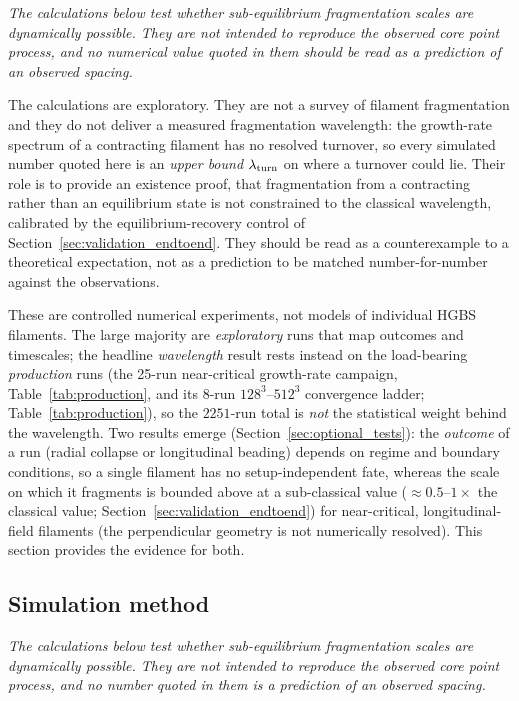 \documentclass[usenatbib,twoside,twocolumn]{mnras}
\begin{document}
\smallskip\noindent\emph{The calculations below test whether sub-equilibrium fragmentation scales are dynamically possible. They are not intended to reproduce the observed core point process, and no numerical value quoted in them should be read as a prediction of an observed spacing.}

\noindent The calculations are exploratory. They are not a survey of filament fragmentation and they do not deliver a measured fragmentation wavelength: the growth-rate spectrum of a contracting filament has no resolved turnover, so every simulated number quoted here is an \emph{upper bound} $\lambda_{\rm turn}$ on where a turnover could lie. Their role is to provide an existence proof, that fragmentation from a contracting rather than an equilibrium state is not constrained to the classical wavelength, calibrated by the equilibrium-recovery control of Section~\ref{sec:validation_endtoend}. They should be read as a counterexample to a theoretical expectation, not as a prediction to be matched number-for-number against the observations.

These are controlled numerical experiments, not models of individual HGBS filaments. The large majority are \emph{exploratory} runs that map outcomes and timescales; the headline \emph{wavelength} result rests instead on the load-bearing \emph{production} runs (the 25-run near-critical growth-rate campaign, Table~\ref{tab:production}, and its 8-run $128^3$--$512^3$ convergence ladder; Table~\ref{tab:production}), so the $2251$-run total is \emph{not} the statistical weight behind the wavelength. Two results emerge (Section~\ref{sec:optional_tests}): the \emph{outcome} of a run (radial collapse or longitudinal beading) depends on regime and boundary conditions, so a single filament has no setup-independent fate, whereas the scale on which it fragments is bounded above at a sub-classical value ($\approx0.5$--$1\times$ the classical value; Section~\ref{sec:validation_endtoend}) for near-critical, longitudinal-field filaments (the perpendicular geometry is not numerically resolved). This section provides the evidence for both.

\subsection{Simulation method}
\label{sec:simmethod}

\smallskip\noindent\emph{The calculations below test whether sub-equilibrium fragmentation scales are dynamically possible. They are not intended to reproduce the observed core point process, and no number quoted in them is a prediction of an observed spacing.}
\end{document}
